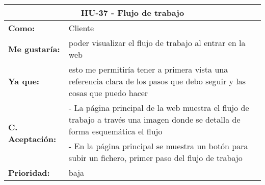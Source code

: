 
\begin{table}[H]
	\begin{tabular}{| p{3cm}| p{12cm} |}
		\hline
		\multicolumn{2}{|c|}{\textbf{HU-37} - Flujo de trabajo} \\ \hline
		\textbf{Como:} & Cliente \\ \hline
		\textbf{Me gustaría:} & poder visualizar el flujo de trabajo al entrar en la web \\ \hline
		\textbf{Ya que:} & esto me permitiría tener a primera vista una referencia clara de los pasos que debo seguir y las cosas que puedo hacer \\ \hline
		\multirow{2}{12cm}{\textbf{C. Aceptación:}} & - La página principal de la web muestra el flujo de trabajo a través una imagen donde se detalla de forma esquemática el flujo \\
		& - En la página principal se muestra un botón para subir un fichero, primer paso del flujo de trabajo \\ \hline
		\textbf{\textbf{Prioridad:}} & baja \\ \hline
	\end{tabular}
\end{table}


